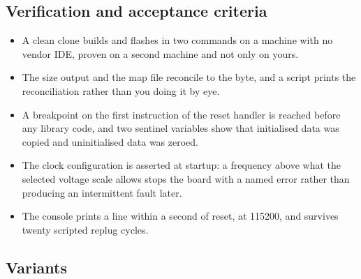 \subsection*{Verification and acceptance criteria}

\begin{itemize}
\item A clean clone builds and flashes in two commands on a machine with no
vendor IDE, proven on a second machine and not only on yours.
\item The size output and the map file reconcile to the byte, and a script
prints the reconciliation rather than you doing it by eye.
\item A breakpoint on the first instruction of the reset handler is reached
before any library code, and two sentinel variables show that initialised data
was copied and uninitialised data was zeroed.
\item The clock configuration is asserted at startup: a frequency above what the
selected voltage scale allows stops the board with a named error rather than
producing an intermittent fault later.
\item The console prints a line within a second of reset, at 115200, and
survives twenty scripted replug cycles.
\end{itemize}

\subsection*{Variants}

